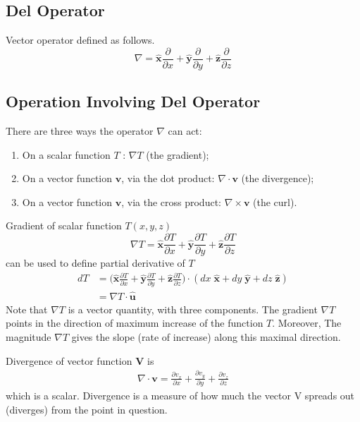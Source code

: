 \documentclass[../main.tex]{subfiles}
\begin{document}
\subsection{Del Operator}
Vector operator defined as follows.
\begin{equation*}
    \nabla = \mathbf{\hat{x}}\frac{\partial}{\partial x}+\mathbf{\hat{y}}\frac{\partial}{\partial y}+\mathbf{\hat{z}}\frac{\partial}{\partial z}
\end{equation*}

\subsection{Operation Involving Del Operator}
There are three ways the operator $\nabla$ can act:
\begin{enumerate}
    \item On a scalar function $T$ : $\nabla T$ (the gradient); 
    \item On a vector function $\mathbf{v}$, via the dot product: $\nabla \cdot \mathbf{v}$ (the divergence); 
    \item On a vector function $\mathbf{v}$, via the cross product: $\nabla \times \mathbf{v}$ (the curl).
\end{enumerate}

Gradient of scalar function $T(x,y,z)$  
\begin{equation*}
    \nabla T = \mathbf{\hat{x}}\frac{\partial T}{\partial x}+\mathbf{\hat{y}}\frac{\partial T}{\partial y}+\mathbf{\hat{z}}\frac{\partial T}{\partial z}
\end{equation*}
can be used to define partial derivative of $T$ 
\begin{align*}
    dT&= \bigg(  \mathbf{\hat{x}}\frac{\partial T}{\partial x}+ \mathbf{\hat{y}}\frac{\partial T}{\partial y}+ \mathbf{\hat{z}}\frac{\partial T}{\partial z} \bigg)\cdot (dx\;  \mathbf{\hat{x}}+dy\; \mathbf{\hat{y}}+dz\; \mathbf{\hat{z}})\\
    &=\nabla T \cdot \mathbf{\hat{u}}
\end{align*}
Note that $\nabla T$ is a vector quantity, with three components. The gradient $\nabla T$ points in the direction of maximum increase of the function $T$. Moreover, The magnitude $\nabla T$ gives the slope (rate of increase) along this maximal direction.

Divergence of vector function \textbf{V} is
\begin{align*}
    \nabla \cdot  \mathbf{v}= \frac{\partial v_x}{\partial x}+\frac{\partial v_y}{\partial y}+\frac{\partial v_z}{\partial z}
\end{align*}
which is a scalar. Divergence is a measure of how much the vector V spreads out (diverges) from the point in question.
\end{document}
